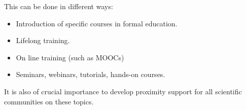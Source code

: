 This can be done in different ways:

\begin{itemize}
  \item Introduction of specific courses in formal education.
  \item Lifelong training.
  \item On line training (such as MOOCs)
  \item Seminars, webinars, tutorials, hands-on courses.
\end{itemize}

It is also of crucial importance to develop proximity support for all scientific communities on these topics.
